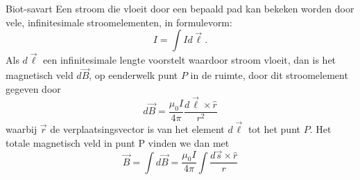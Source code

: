 \begin{lem}{Biot-savart}
    Een stroom die vloeit door een bepaald pad kan bekeken worden door vele, infinitesimale
    stroomelementen, in formulevorm:
    \begin{equation*}
        I = \int I d\Vec{\ell}.
    \end{equation*}
    Als $d\Vec{\ell}$ een infinitesimale lengte voorstelt waardoor stroom
    vloeit, dan is het magnetisch veld $d\Vec{B}$, op eenderwelk punt $P$ in de ruimte, door
    dit stroomelement gegeven door
    \begin{equation*}
        d\Vec{B} = \dfrac{\mu_{0}I}{4\pi}\dfrac{d\Vec{\ell} \times \hat{r}}{r^2}
    \end{equation*}
    waarbij $\Vec{r}$ de verplaatsingsvector is van het element $d\Vec{\ell}$ tot het punt $P$.
    Het totale magnetisch veld in punt P vinden we dan met
    \begin{equation*}
        \Vec{B} = \int d\Vec{B} = \dfrac{\mu_{0}I}{4\pi} \int \dfrac{d\Vec{s} \times \hat{r}}{r}
    \end{equation*}
\end{lem}